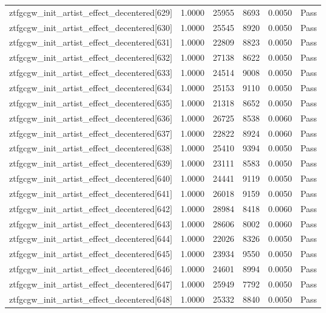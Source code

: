 \begin{table}[htbp]
\begin{tabular}{llrrll}
ztfgcgw\_init\_artist\_effect\_decentered[629] & 1.0000 & 25955 & 8693 & 0.0050 & Pass \\
ztfgcgw\_init\_artist\_effect\_decentered[630] & 1.0000 & 25545 & 8920 & 0.0050 & Pass \\
ztfgcgw\_init\_artist\_effect\_decentered[631] & 1.0000 & 22809 & 8823 & 0.0050 & Pass \\
ztfgcgw\_init\_artist\_effect\_decentered[632] & 1.0000 & 27138 & 8622 & 0.0050 & Pass \\
ztfgcgw\_init\_artist\_effect\_decentered[633] & 1.0000 & 24514 & 9008 & 0.0050 & Pass \\
ztfgcgw\_init\_artist\_effect\_decentered[634] & 1.0000 & 25153 & 9110 & 0.0050 & Pass \\
ztfgcgw\_init\_artist\_effect\_decentered[635] & 1.0000 & 21318 & 8652 & 0.0050 & Pass \\
ztfgcgw\_init\_artist\_effect\_decentered[636] & 1.0000 & 26725 & 8538 & 0.0060 & Pass \\
ztfgcgw\_init\_artist\_effect\_decentered[637] & 1.0000 & 22822 & 8924 & 0.0060 & Pass \\
ztfgcgw\_init\_artist\_effect\_decentered[638] & 1.0000 & 25410 & 9394 & 0.0050 & Pass \\
ztfgcgw\_init\_artist\_effect\_decentered[639] & 1.0000 & 23111 & 8583 & 0.0050 & Pass \\
ztfgcgw\_init\_artist\_effect\_decentered[640] & 1.0000 & 24441 & 9119 & 0.0050 & Pass \\
ztfgcgw\_init\_artist\_effect\_decentered[641] & 1.0000 & 26018 & 9159 & 0.0050 & Pass \\
ztfgcgw\_init\_artist\_effect\_decentered[642] & 1.0000 & 28984 & 8418 & 0.0060 & Pass \\
ztfgcgw\_init\_artist\_effect\_decentered[643] & 1.0000 & 28606 & 8002 & 0.0060 & Pass \\
ztfgcgw\_init\_artist\_effect\_decentered[644] & 1.0000 & 22026 & 8326 & 0.0050 & Pass \\
ztfgcgw\_init\_artist\_effect\_decentered[645] & 1.0000 & 23934 & 9550 & 0.0050 & Pass \\
ztfgcgw\_init\_artist\_effect\_decentered[646] & 1.0000 & 24601 & 8994 & 0.0050 & Pass \\
ztfgcgw\_init\_artist\_effect\_decentered[647] & 1.0000 & 25949 & 7792 & 0.0050 & Pass \\
ztfgcgw\_init\_artist\_effect\_decentered[648] & 1.0000 & 25332 & 8840 & 0.0050 & Pass \\

\end{tabular}
\end{table}
